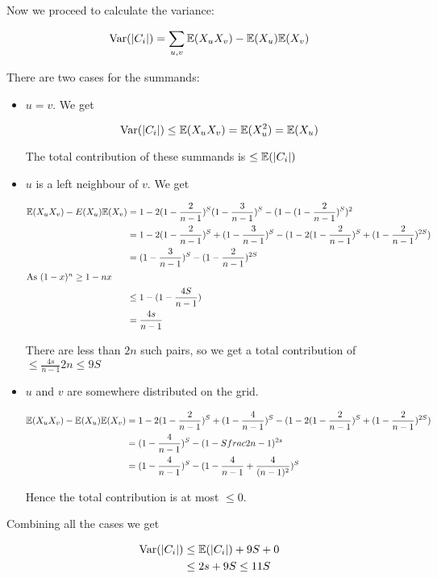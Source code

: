 Now we proceed to calculate the variance:

\begin{align*}
\operatorname{Var}(|C_i|) &= \sum_{u,v} \mathbb{E}(X_uX_v) - \mathbb{E}(X_u) \mathbb{E}(X_v)\\
\end{align*}

There are two cases for the summands:

\begin{itemize}
\item $u=v$. We get

\[\operatorname{Var}(|C_i|) \leq \mathbb{E}(X_uX_v) = \mathbb{E}(X_u^2) = \mathbb{E}(X_u)\]

The total contribution of these summands is $\leq \mathbb{E}(|C_i|)$

\item $u$ is a left neighbour of $v$. We get

\begin{align*}
\mathbb{E}(X_uX_v) -E(X_u) \mathbb{E}(X_v) &= 1-2(1-\frac{2}{n-1})^S  (1-\frac{3}{n-1})^S -(1-(1-\frac{2}{n-1})^S)^2\\
	&=1-2(1-\frac{2}{n-1})^S+(1-\frac{3}{n-1})^S -(1-2(1-\frac{2}{n-1})^S+(1-\frac{2}{n-1})^{2S})\\
	&=(1-\frac{3}{n-1})^S -(1-\frac{2}{n-1})^{2S}\\
\intertext{As $(1-x)^n\geq 1-nx$}
	&\leq 1 -(1-\frac{4S}{n-1})\\
	&=\frac{4s}{n-1}
\end{align*}
	
There are less than $2n$ such pairs, so we get a total contribution of $\leq \frac{4s}{n-1}2n \leq 9S$

\item $u$ and $v$ are somewhere distributed on the grid. 

\begin{align*}
\mathbb{E}(X_uX_v)-\mathbb{E}(X_u)\mathbb{E}(X_v) &= 1-2(1-\frac{2}{n-1})^S+(1-\frac{4}{n-1})^S-(1-2(1-\frac{2}{n-1})^S +(1-\frac{2}{n-1})^{2S})\\
&= (1-\frac{4}{n-1})^S - (1-Sfrac{2}{n-1})^{2s}\\
&= (1-\frac{4}{n-1})^S-(1-\frac{4}{n-1}+\frac{4}{(n-1)^2})^S\\
\end{align*}

Hence the total contribution is at most $\leq 0$.
\end{itemize}

Combining all the cases we get 

\begin{align*}
\operatorname{Var}(|C_i|) &\leq \mathbb{E}(|C_i|) +9S + 0 \\
	&\leq 2s+9S\leq 11S
\end{align*}

